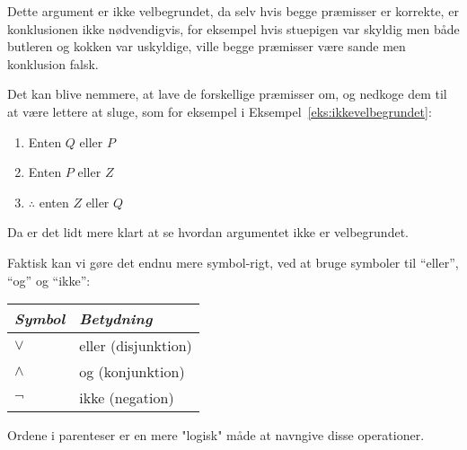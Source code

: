 Dette argument er ikke velbegrundet, da selv hvis begge præmisser er korrekte, er konklusionen ikke nødvendigvis, for eksempel hvis stuepigen var skyldig men både butleren og kokken var uskyldige, ville begge præmisser være sande men konklusion falsk.

Det kan blive nemmere, at lave de forskellige præmisser om, og nedkoge dem til at være lettere at sluge, som for eksempel i Eksempel~\ref{eks:ikkevelbegrundet}:
\begin{center}
  \begin{enumerate}
    \item Enten $Q$ eller $P$
    \item Enten $P$ eller $Z$
    \item $\therefore$ enten $Z$ eller $Q$
  \end{enumerate}
\end{center}
Da er det lidt mere klart at se hvordan argumentet ikke er velbegrundet.

Faktisk kan vi gøre det endnu mere symbol-rigt, ved at bruge symboler til ``eller'', ``og'' og ``ikke'':
\begin{table}[h]
\centering
\begin{tabular}{ll}
\textit{Symbol} & \textit{Betydning} \\ \hline
$\lor$          & eller (disjunktion)              \\
$\land$          & og (konjunktion)                 \\
$\neg$          & ikke (negation)
\end{tabular}
\end{table}

Ordene i parenteser er en mere "logisk" måde at navngive disse operationer.

